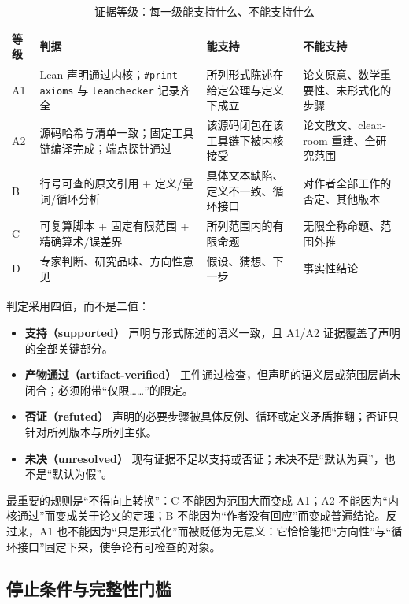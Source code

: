 \documentclass[11pt,a4paper]{ctexart}
\theoremstyle{plain}
\theoremstyle{definition}
\newcommand{\Aone}{\textsf{A1}}
\newcommand{\Atwo}{\textsf{A2}}
\newcommand{\Bclass}{\textsf{B}}
\newcommand{\Cclass}{\textsf{C}}
\newcommand{\Dclass}{\textsf{D}}
\begin{document}
\begin{table}[htbp]
\centering
\small
\caption{证据等级：每一级能支持什么、不能支持什么}
\label{tab:evidence}
\begin{tabularx}{\textwidth}{@{}>{\raggedright\arraybackslash}p{}
>{\raggedright\arraybackslash}p{}
>{\raggedright\arraybackslash}X
>{\raggedright\arraybackslash}p{}@{}}
\toprule
等级 & 判据 & 能支持 & 不能支持\\
\midrule
\Aone & Lean 声明通过内核；\texttt{\#print axioms} 与 \texttt{leanchecker} 记录齐全 & 所列形式陈述在给定公理与定义下成立 & 论文原意、数学重要性、未形式化的步骤\\
\addlinespace
\Atwo & 源码哈希与清单一致；固定工具链编译完成；端点探针通过 & 该源码闭包在该工具链下被内核接受 & 论文散文、clean-room 重建、全研究范围\\
\addlinespace
\Bclass & 行号可查的原文引用 + 定义/量词/循环分析 & 具体文本缺陷、定义不一致、循环接口 & 对作者全部工作的否定、其他版本\\
\addlinespace
\Cclass & 可复算脚本 + 固定有限范围 + 精确算术/误差界 & 所列范围内的有限命题 & 无限全称命题、范围外推\\
\addlinespace
\Dclass & 专家判断、研究品味、方向性意见 & 假设、猜想、下一步 & 事实性结论\\
\bottomrule
\end{tabularx}
\end{table}

判定采用四值，而不是二值：
\begin{itemize}
\item \textbf{支持（supported）} 声明与形式陈述的语义一致，且 A1/A2 证据覆盖了声明的全部关键部分。
\item \textbf{产物通过（artifact-verified）} 工件通过检查，但声明的语义层或范围层尚未闭合；必须附带“仅限……”的限定。
\item \textbf{否证（refuted）} 声明的必要步骤被具体反例、循环或定义矛盾推翻；否证只针对所列版本与所列主张。
\item \textbf{未决（unresolved）} 现有证据不足以支持或否证；未决不是“默认为真”，也不是“默认为假”。
\end{itemize}

最重要的规则是“不得向上转换”：C 不能因为范围大而变成 A1；A2 不能因为“内核通过”而变成关于论文的定理；B 不能因为“作者没有回应”而变成普遍结论。反过来，A1 也不能因为“只是形式化”而被贬低为无意义：它恰恰能把“方向性”与“循环接口”固定下来，使争论有可检查的对象。

\subsection{停止条件与完整性门槛}
\label{sec:stops}
\end{document}
